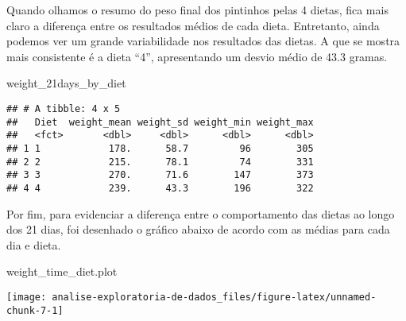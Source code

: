 \documentclass[]{article}
\newenvironment{Shaded}{\begin{snugshade}}{\end{snugshade}}
\newcommand{\NormalTok}[1]{#1}
\begin{document}
Quando olhamos o resumo do peso final dos pintinhos pelas 4 dietas, fica
mais claro a diferença entre os resultados médios de cada dieta.
Entretanto, ainda podemos ver um grande variabilidade nos resultados das
dietas. A que se mostra mais consistente é a dieta ``4'', apresentando
um desvio médio de 43.3 gramas.

\begin{Shaded}
\begin{Highlighting}[]
\NormalTok{weight_21days_by_diet}
\end{Highlighting}
\end{Shaded}

\begin{verbatim}
## # A tibble: 4 x 5
##   Diet  weight_mean weight_sd weight_min weight_max
##   <fct>       <dbl>     <dbl>      <dbl>      <dbl>
## 1 1            178.      58.7         96        305
## 2 2            215.      78.1         74        331
## 3 3            270.      71.6        147        373
## 4 4            239.      43.3        196        322
\end{verbatim}

Por fim, para evidenciar a diferença entre o comportamento das dietas ao
longo dos 21 dias, foi desenhado o gráfico abaixo de acordo com as
médias para cada dia e dieta.

\begin{Shaded}
\begin{Highlighting}[]
\NormalTok{weight_time_diet.plot}
\end{Highlighting}
\end{Shaded}

\begin{center}\texttt{[image: analise-exploratoria-de-dados\_files/figure-latex/unnamed-chunk-7-1]} \end{center}
\end{document}
